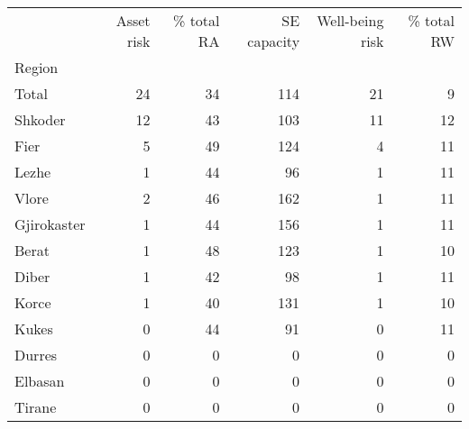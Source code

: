\begin{tabular}{lrrrrr}
\toprule
{} &  Asset risk &  \% total RA &  SE capacity &  Well-being risk &  \% total RW \\
Region      &             &             &              &                  &             \\
\midrule
Total       &          24 &          34 &          114 &               21 &           9 \\
Shkoder     &          12 &          43 &          103 &               11 &          12 \\
Fier        &           5 &          49 &          124 &                4 &          11 \\
Lezhe       &           1 &          44 &           96 &                1 &          11 \\
Vlore       &           2 &          46 &          162 &                1 &          11 \\
Gjirokaster &           1 &          44 &          156 &                1 &          11 \\
Berat       &           1 &          48 &          123 &                1 &          10 \\
Diber       &           1 &          42 &           98 &                1 &          11 \\
Korce       &           1 &          40 &          131 &                1 &          10 \\
Kukes       &           0 &          44 &           91 &                0 &          11 \\
Durres      &           0 &           0 &            0 &                0 &           0 \\
Elbasan     &           0 &           0 &            0 &                0 &           0 \\
Tirane      &           0 &           0 &            0 &                0 &           0 \\
\bottomrule
\end{tabular}
